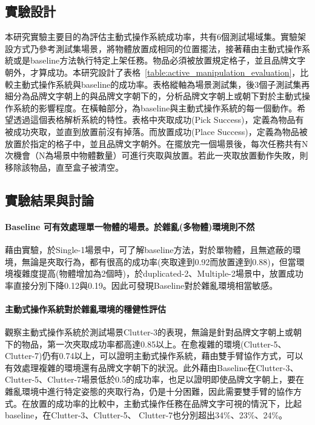 \subsection{實驗設計}
本研究實驗主要目的為評估主動式操作系統成功率，共有6個測試場域集。實驗架設方式乃參考測試集場景，將物體放置成相同的位置擺法，接著藉由主動式操作系統或是baseline方法執行特定上架任務。物品必須被放置規定格子，並且品牌文字朝外，才算成功。本研究設計了表格~\ref{table:active_manipulation_evaluation}，比較主動式操作系統與baseline的成功率。表格縱軸為場景測試集，後3個子測試集再細分為品牌文字朝上的與品牌文字朝下的，分析品牌文字朝上或朝下對於主動式操作系統的影響程度。在橫軸部分，為baseline與主動式操作系統的每一個動作。希望透過這個表格解析系統的特性。表格中夾取成功(Pick Success)，定義為物品有被成功夾取，並直到放置前沒有掉落。而放置成功(Place Success)，定義為物品被放置於指定的格子中，並且品牌文字朝外。在擺放完一個場景後，每次任務共有N次機會（N為場景中物體數量）可進行夾取與放置。若此一夾取放置動作失敗，則移除該物品，直至盒子被清空。




\subsection{實驗結果與討論}

\paragraph{Baseline 可有效處理單一物體的場景。於雜亂(多物體)環境則不然}
藉由實驗，於Single-1場景中，可了解baseline方法，對於單物體，且無遮蔽的環境，無論是夾取行為，都有很高的成功率(夾取達到0.92而放置達到0.88)，但當環境複雜度提高(物體增加為2個時)，於duplicated-2、Multiple-2場景中，放置成功率直接分別下降0.12與0.19。因此可發現Baseline對於雜亂環境相當敏感。

\paragraph{主動式操作系統對於雜亂環境的穩健性評估}
觀察主動式操作系統於測試場景Clutter-3的表現，無論是針對品牌文字朝上或朝下的物品，第一次夾取成功率都高達0.85以上。在愈複雜的環境(Clutter-5、Clutter-7)仍有0.74以上，可以證明主動式操作系統，藉由雙手臂協作方式，可以有效處理複雜的環境還有品牌文字朝下的狀況。此外藉由Baseline在Clutter-3、Clutter-5、Clutter-7場景低於0.5的成功率，也足以證明即使品牌文字朝上，要在雜亂環境中進行特定姿態的夾取行為，仍是十分困難，因此需要雙手臂的協作方式。在放置的成功率的比較中，主動式操作任務在品牌文字可視的情況下，比起baseline，在Clutter-3、Clutter-5、 Clutter-7也分別超出34\%、23\%、24\%。

